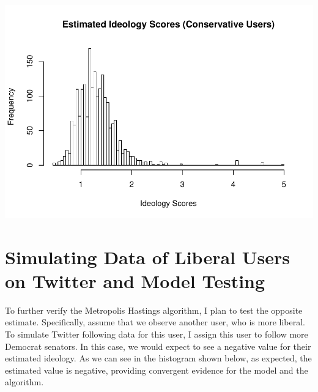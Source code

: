 \documentclass[]{book}
\newenvironment{Shaded}{\begin{snugshade}}{\end{snugshade}}
\newcommand{\KeywordTok}[1]{\textcolor[rgb]{0.13,0.29,0.53}{\textbf{#1}}}
\newcommand{\DataTypeTok}[1]{\textcolor[rgb]{0.13,0.29,0.53}{#1}}
\newcommand{\DecValTok}[1]{\textcolor[rgb]{0.00,0.00,0.81}{#1}}
\newcommand{\StringTok}[1]{\textcolor[rgb]{0.31,0.60,0.02}{#1}}
\newcommand{\OperatorTok}[1]{\textcolor[rgb]{0.81,0.36,0.00}{\textbf{#1}}}
\newcommand{\NormalTok}[1]{#1}
\begin{document}
\begin{Shaded}
\end{Shaded}

\includegraphics{bookdown-demo_files/figure-latex/unnamed-chunk-23-3.pdf}

\section{Simulating Data of Liberal Users on Twitter and Model
Testing}\label{simulating-data-of-liberal-users-on-twitter-and-model-testing}

To further verify the Metropolis Hastings algorithm, I plan to test the
opposite estimate. Specifically, assume that we observe another user,
who is more liberal. To simulate Twitter following data for this user, I
assign this user to follow more Democrat senators. In this case, we
would expect to see a negative value for their estimated ideology. As we
can see in the histogram shown below, as expected, the estimated value
is negative, providing convergent evidence for the model and the
algorithm.
\end{document}
